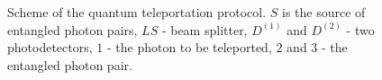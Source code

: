 \begin{figure}
\centering


\caption{Scheme of the quantum teleportation protocol. $S$ is the source of entangled photon pairs, 
$LS$ - beam splitter, $D^{(1)}$ and $D^{(2)}$ - two photodetectors, $1$ -
  the photon to be teleported, $2$ and $3$ - the entangled photon pair.}
\label{figTeleport}
\end{figure}